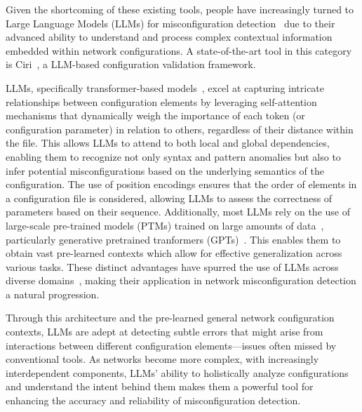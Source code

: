 Given the shortcoming of these existing tools,
people have increasingly turned to Large Language Models (LLMs) for misconfiguration detection~\cite{bogdanov2024leveraging,chen2024automatic,wang2024identifying,liu2024large, wang2024netconfeval} due to their advanced ability to understand and process complex contextual information embedded within network configurations. A state-of-the-art tool in this category is Ciri~\cite{lian2023configuration}, a LLM-based configuration validation framework.

LLMs, specifically transformer-based models~\cite{vaswani2017attention,hill2024transformers,lin2022survey}, excel at capturing intricate relationships between configuration elements by leveraging self-attention mechanisms that dynamically weigh the importance of each token (or configuration parameter) in relation to others, regardless of their distance within the file. This allows LLMs to attend to both local and global dependencies, enabling them to recognize not only syntax and pattern anomalies but also to infer potential misconfigurations based on the underlying semantics of the configuration. The use of position encodings ensures that the order of elements in a configuration file is considered, allowing LLMs to assess the correctness of parameters based on their sequence. Additionally, most LLMs rely on the use of large-scale pre-trained models (PTMs) trained on large amounts of data~\cite{qiu2020pre}, particularly generative pretrained tranformers (GPTs)~\cite{achiam2023gpt,touvron2023llama,shanahan2024talking,taylor2023galactica,brown2020language,chowdhery2023palm}. This enables them to obtain vast pre-learned contexts which allow for effective generalization across various tasks.
These distinct advantages have spurred the use of LLMs across diverse domains~\cite{carion2020end,sheng2019nrtr,neil2020transformers,parmar2018image,chen2021developing,gulati2020conformer}, making their application in network misconfiguration detection a natural progression.

Through this architecture and the pre-learned general network configuration contexts, LLMs are adept at detecting subtle errors that might arise from interactions between different configuration elements—issues often missed by conventional tools. As networks become more complex, with increasingly interdependent components, LLMs' ability to holistically analyze configurations and understand the intent behind them makes them a powerful tool for enhancing the accuracy and reliability of misconfiguration detection.


